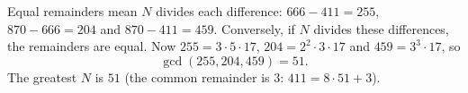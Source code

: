 Equal remainders mean $N$ divides each difference: $666-411=255$, $870-666=204$ and $870-411=459$. Conversely, if $N$ divides these differences, the remainders are equal. Now $255=3\cdot5\cdot17$, $204=2^2\cdot3\cdot17$ and $459=3^3\cdot17$, so
\[\gcd(255,204,459)=51.\]
The greatest $N$ is $\boxed{51}$ (the common remainder is $3$: $411=8\cdot51+3$).
